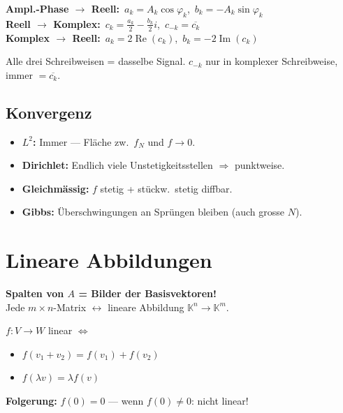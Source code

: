 \documentclass[10pt,a4paper,twocolumn]{article}
\newcommand{\seccol}{black}
\newcommand{\setseccol}[1]{\renewcommand{\seccol}{#1}}
\newcommand{\detail}[1]{{\small\color{detail}#1}}
\begin{document}
	\begin{tcolorbox}[recbox, title={Umrechnungsformeln}]
		\textbf{Ampl.-Phase $\to$ Reell:}\ $a_k=A_k\cos\varphi_k$,\ $b_k=-A_k\sin\varphi_k$\\
		\textbf{Reell $\to$ Komplex:}\ $c_k=\frac{a_k}{2}-\frac{b_k}{2}i$,\ $c_{-k}=\overline{c_k}$\\
		\textbf{Komplex $\to$ Reell:}\ $a_k=2\operatorname{Re}(c_k)$,\ $b_k=-2\operatorname{Im}(c_k)$
	\end{tcolorbox}
	
	\detail{Alle drei Schreibweisen = dasselbe Signal. $c_{-k}$ nur in komplexer Schreibweise, immer $=\overline{c_k}$.}
	
	\subsection{Konvergenz}
	
	\begin{itemize}
		\item \textbf{$L^2$:} Immer — Fläche zw.\ $f_N$ und $f\to 0$.
		\item \textbf{Dirichlet:} Endlich viele Unstetigkeitsstellen $\Rightarrow$ punktweise.
		\item \textbf{Gleichmässig:} $f$ stetig + stückw.\ stetig diffbar.
		\item \textbf{Gibbs:} Überschwingungen an Sprüngen bleiben (auch grosse $N$).
	\end{itemize}
	
	\setseccol{c6}
	\section{Lineare Abbildungen}
	
	\begin{tcolorbox}[tipbox]
		\textbf{Spalten von $A$ = Bilder der Basisvektoren!}\\
		Jede $m\times n$-Matrix $\leftrightarrow$ lineare Abbildung $\mathbb{K}^n\to\mathbb{K}^m$.
	\end{tcolorbox}
	
	\begin{tcolorbox}[defbox, title={Def. 6.1.1 — Lineare Abbildung}]
		$f:V\to W$ linear $\iff$
		\begin{itemize}[leftmargin=1em]
			\item[i)] $f(v_1+v_2)=f(v_1)+f(v_2)$
			\item[ii)] $f(\lambda v)=\lambda f(v)$
		\end{itemize}
		\textbf{Folgerung:} $f(0)=0$ — wenn $f(0)\neq0$: nicht linear!
	\end{tcolorbox}
	
\end{document}
